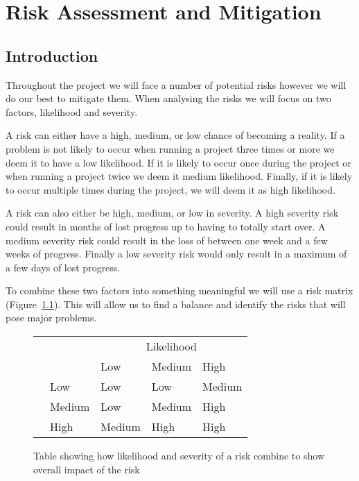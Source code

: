 \chapter{Risk Assessment and Mitigation}
\section{Introduction}
Throughout the project we will face a number of potential risks however we will do our best to mitigate them.
When analysing the risks we will focus on two factors, likelihood and severity.

A risk can either have a high, medium, or low chance of becoming a reality.
If a problem is not likely to occur when running a project three times or more we deem it to have a low likelihood.
If it is likely to occur once during the project or when running a project twice we deem it medium likelihood.
Finally, if it is likely to occur multiple times during the project, we will deem it as high likelihood.

A risk can also either be high, medium, or low in severity.
A high severity risk could result in months of lost progress up to having to totally start over.
A medium severity risk could result in the loss of between one week and a few weeks of progress.
Finally a low severity risk would only result in a maximum of a few days of lost progress.

To combine these two factors into something meaningful we will use a risk matrix (Figure~\ref{fig:risktable}).
This will allow us to find a balance and identify the risks that will pose major problems.

\begin{figure}[h]
	\centering
	\newcommand{\low}{\cellcolor{green}Low}
	\newcommand{\medium}{\cellcolor{orange}Medium}
	\newcommand{\high}{\cellcolor{red}High}
	\begin{tabular}{|l|l||l|l|l|}
		\hline
		\multicolumn{2}{|l||}{\multirow{2}{*}{}} & \multicolumn{3}{c|}{Likelihood} \\ \cline{3-5}
		\multicolumn{2}{|l||}{}                  & Low       & Medium   & High     \\ \hhline{|==||=|=|=|}
		\multirow{3}{*}{Severity}    & Low      & \low       & \low      & \medium   \\ \cline{2-5}
		& Medium   & \low       & \medium   & \high     \\ \cline{2-5}
		& High     & \medium    & \high     & \high     \\ \hline
	\end{tabular}
	\caption{Table showing how likelihood and severity of a risk combine to show overall impact of the risk}
	\label{fig:risktable}
\end{figure}

